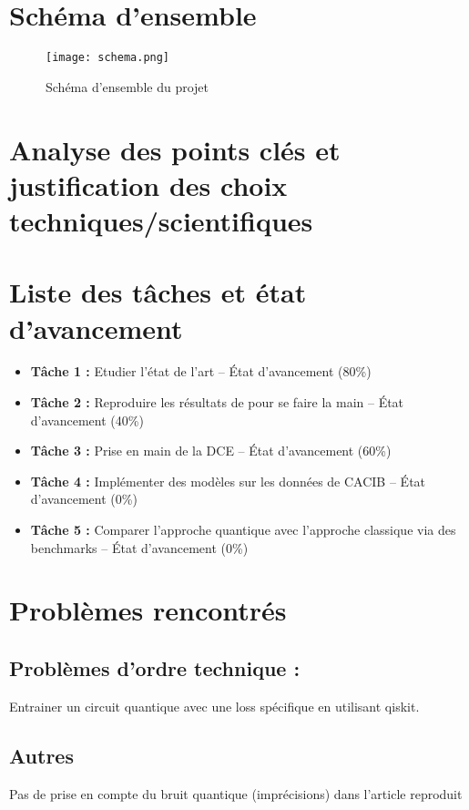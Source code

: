 \documentclass[11pt,a4paper]{article}
\begin{document}
\section{Schéma d'ensemble}
\begin{figure}[h!]
    \centering
    \texttt{[image: schema.png]}
    \caption{Schéma d'ensemble du projet}
    \label{fig:schema}
\end{figure}

\section{Analyse des points clés et justification des choix \\techniques/scientifiques}

\section{Liste des tâches et état d'avancement}

\begin{itemize}
    \item \textbf{Tâche 1 :} Etudier l'état de l'art -- État d'avancement (80\%)
    \item \textbf{Tâche 2 :} Reproduire les résultats de\cite{lloyd2020quantum} pour se faire la main -- État d'avancement (40\%)
    \item \textbf{Tâche 3 :} Prise en main de la DCE -- État d'avancement (60\%)
    \item \textbf{Tâche 4 :} Implémenter des modèles sur les données de CACIB -- État d'avancement (0\%)
    \item \textbf{Tâche 5 :} Comparer l'approche quantique avec l'approche classique via des benchmarks -- État d'avancement (0\%)
\end{itemize}

\section{Problèmes rencontrés}

\subsection*{Problèmes d'ordre technique : }
Entrainer un circuit quantique avec une loss spécifique en utilisant qiskit.

\subsection*{Autres}
Pas de prise en compte du bruit quantique (imprécisions) dans l'article reproduit



\end{document}
